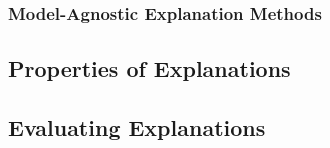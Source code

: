 \documentclass[english]{tktltiki2}
\theoremstyle{definition}
\theoremstyle{remark}
\begin{document}
\subsubsection{Model-Agnostic Explanation Methods} %

\subsection{Properties of Explanations} %

\subsection{Evaluating Explanations} %
\end{document}
